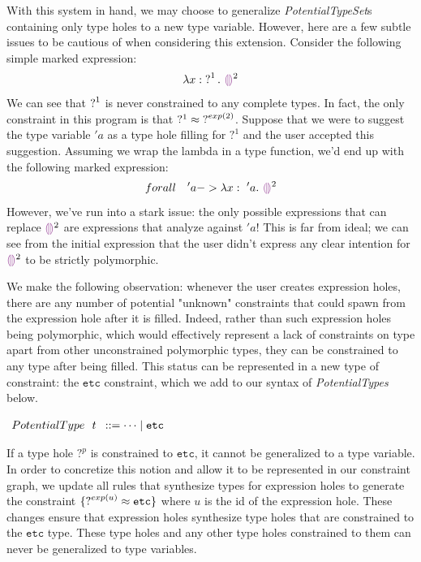 With this system in hand, we may choose to generalize \emph{PotentialTypeSet}s containing only type holes to a new type variable. However, here are a few subtle issues to be cautious of when considering this extension. Consider the following simple marked expression:
$$\ECLam{x}{\TUnknown^1}{\EEHole^2}$$
We can see that $\operatorname{?}^1$ is never constrained to any complete types. In fact, the only constraint in this program is that $?^1 \approx \mathtt{?}^{exp(2)}$. Suppose that we were to suggest the type variable $'a$ as a type hole filling for $?^1$ and the user accepted this suggestion. Assuming we wrap the lambda in a type function, we'd end up with the following marked expression:
$$forall ~~~'a -> \ECLam{x}{~'a}{\EEHole^2}$$
However, we've run into a stark issue: the only possible expressions that can replace $\EEHole^2$ are expressions that analyze against $'a$! This is far from ideal; we can see from the initial expression that the user didn't express any clear intention for $\EEHole^2$ to be strictly polymorphic.

We make the following observation: whenever the user creates expression holes, there are any number of potential "unknown" constraints that could spawn from the expression hole after it is filled. Indeed, rather than such expression holes being polymorphic, which would effectively represent a lack of constraints on type apart from other unconstrained polymorphic types, they can be constrained to any type after being filled. This status can be represented in a new type of constraint: the $\mathtt{etc}$ constraint, which we add to our syntax of \emph{PotentialTypes} below.
\begin{center}
$\arraycolsep=4pt\begin{array}{lll}
PotentialType~~ t & ::= 
  \dots \mid \mathtt{etc}
\end{array}$
\end{center}
If a type hole $?^p$ is constrained to $\mathtt{etc}$, it cannot be generalized to a type variable. In order to concretize this notion and allow it to be represented in our constraint graph, we update all rules that synthesize types for expression holes to generate the constraint $\{ \operatorname{?}^{exp(u)} \approx \mathtt{etc} \}$ where $u$ is the id of the expression hole. These changes ensure that expression holes synthesize type holes that are constrained to the $\mathtt{etc}$ type. These type holes and any other type holes constrained to them can never be generalized to type variables.

